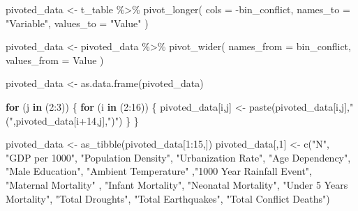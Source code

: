 \documentclass[
  letterpaper,
  DIV=11,
  numbers=noendperiod]{scrartcl}
\newenvironment{Shaded}{\begin{snugshade}}{\end{snugshade}}
\newcommand{\AttributeTok}[1]{\textcolor[rgb]{0.40,0.45,0.13}{#1}}
\newcommand{\ControlFlowTok}[1]{\textcolor[rgb]{0.00,0.23,0.31}{\textbf{#1}}}
\newcommand{\DecValTok}[1]{\textcolor[rgb]{0.68,0.00,0.00}{#1}}
\newcommand{\FunctionTok}[1]{\textcolor[rgb]{0.28,0.35,0.67}{#1}}
\newcommand{\NormalTok}[1]{\textcolor[rgb]{0.00,0.23,0.31}{#1}}
\newcommand{\OtherTok}[1]{\textcolor[rgb]{0.00,0.23,0.31}{#1}}
\newcommand{\SpecialCharTok}[1]{\textcolor[rgb]{0.37,0.37,0.37}{#1}}
\newcommand{\StringTok}[1]{\textcolor[rgb]{0.13,0.47,0.30}{#1}}
\begin{document}
\begin{Shaded}
\begin{Highlighting}[]
\NormalTok{pivoted\_data }\OtherTok{\textless{}{-}}\NormalTok{ t\_table }\SpecialCharTok{\%\textgreater{}\%}  
  \FunctionTok{pivot\_longer}\NormalTok{(}
    \AttributeTok{cols =} \SpecialCharTok{{-}}\NormalTok{bin\_conflict,}
    \AttributeTok{names\_to =} \StringTok{"Variable"}\NormalTok{,}
    \AttributeTok{values\_to =} \StringTok{"Value"}
\NormalTok{  ) }

\NormalTok{pivoted\_data }\OtherTok{\textless{}{-}}\NormalTok{ pivoted\_data }\SpecialCharTok{\%\textgreater{}\%} 
  \FunctionTok{pivot\_wider}\NormalTok{(}
    \AttributeTok{names\_from =}\NormalTok{ bin\_conflict,}
    \AttributeTok{values\_from =}\NormalTok{ Value}
\NormalTok{  )}

\NormalTok{pivoted\_data }\OtherTok{\textless{}{-}} \FunctionTok{as.data.frame}\NormalTok{(pivoted\_data)}

\ControlFlowTok{for}\NormalTok{ (j }\ControlFlowTok{in}\NormalTok{ (}\DecValTok{2}\SpecialCharTok{:}\DecValTok{3}\NormalTok{)) \{}
  \ControlFlowTok{for}\NormalTok{ (i }\ControlFlowTok{in}\NormalTok{ (}\DecValTok{2}\SpecialCharTok{:}\DecValTok{16}\NormalTok{)) \{}
\NormalTok{    pivoted\_data[i,j] }\OtherTok{\textless{}{-}} \FunctionTok{paste}\NormalTok{(pivoted\_data[i,j],}\StringTok{"("}\NormalTok{,pivoted\_data[i}\SpecialCharTok{+}\DecValTok{14}\NormalTok{,j],}\StringTok{")"}\NormalTok{)}
\NormalTok{  \}}
\NormalTok{\}}

  
\NormalTok{pivoted\_data }\OtherTok{\textless{}{-}} \FunctionTok{as\_tibble}\NormalTok{(pivoted\_data[}\DecValTok{1}\SpecialCharTok{:}\DecValTok{15}\NormalTok{,])}
\NormalTok{pivoted\_data[,}\DecValTok{1}\NormalTok{] }\OtherTok{\textless{}{-}} \FunctionTok{c}\NormalTok{(}\StringTok{"N"}\NormalTok{, }\StringTok{"GDP per 1000"}\NormalTok{, }\StringTok{"Population Density"}\NormalTok{,}
                             \StringTok{"Urbanization Rate"}\NormalTok{, }\StringTok{"Age Dependency"}\NormalTok{,}
                             \StringTok{"Male Education"}\NormalTok{, }\StringTok{"Ambient Temperature"}
\NormalTok{                             ,}\StringTok{"1000 Year Rainfall Event"}\NormalTok{, }\StringTok{"Maternal Mortality"}
\NormalTok{                             , }\StringTok{"Infant Mortality"}\NormalTok{, }\StringTok{"Neonatal Mortality"}\NormalTok{,}
                             \StringTok{"Under 5 Years Mortality"}\NormalTok{, }\StringTok{"Total Droughts"}\NormalTok{,}
                             \StringTok{"Total Earthquakes"}\NormalTok{, }\StringTok{"Total Conflict Deaths"}\NormalTok{)}


\end{Highlighting}
\end{Shaded}
\end{document}
